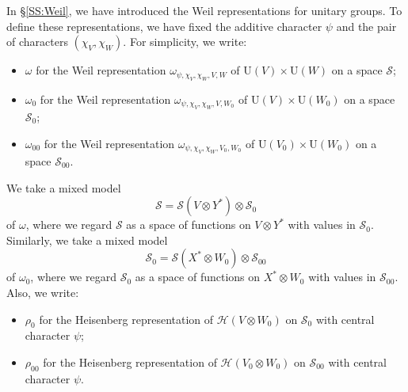 \documentclass[11pt]{amsart}
\numberwithin{equation}{section}
\theoremstyle{plain}
\theoremstyle{definition}
\theoremstyle{remark}
\def\U{\mathrm{U}}
\def\H{\mathscr{H}}
\def\s{\mathscr{S}}
\begin{document}
In \S \ref{SS:Weil}, we have introduced the Weil representations for unitary groups.
To define these representations, we have fixed the additive character $\psi$ and the pair of characters $(\chi_V, \chi_W)$.
For simplicity, we write:
\begin{itemize}
 \item $\omega$ for the Weil representation $\omega_{\psi, \chi_V, \chi_W, V, W}$ of $\U(V) \times \U(W)$ on a space $\s$;
 \item $\omega_0$ for the Weil representation $\omega_{\psi, \chi_V, \chi_W, V, W_0}$ of $\U(V) \times \U(W_0)$ on a space $\s_0$;
 \item $\omega_{00}$ for the Weil representation $\omega_{\psi, \chi_V, \chi_W, V_0, W_0}$ of $\U(V_0) \times \U(W_0)$ on a space $\s_{00}$.
\end{itemize}
We take a mixed model
\[
 \s = \s(V \otimes Y^*) \otimes \s_0
\]
of $\omega$, where we regard $\s$ as a space of functions on $V \otimes Y^*$ with values in $\s_0$.
Similarly, we take a mixed model
\[
 \s_0 = \s(X^* \otimes W_0) \otimes \s_{00}
\]
of $\omega_0$, where we regard $\s_0$ as a space of functions on $X^* \otimes W_0$ with values in $\s_{00}$.
Also, we write:
\begin{itemize}
\item $\rho_0$ for the Heisenberg representation of $\H(V \otimes W_0)$ on $\s_0$ with central character $\psi$;
\item $\rho_{00}$ for the Heisenberg representation of $\H(V_0 \otimes W_0)$ on $\s_{00}$ with central character $\psi$.
\end{itemize}
\end{document}
